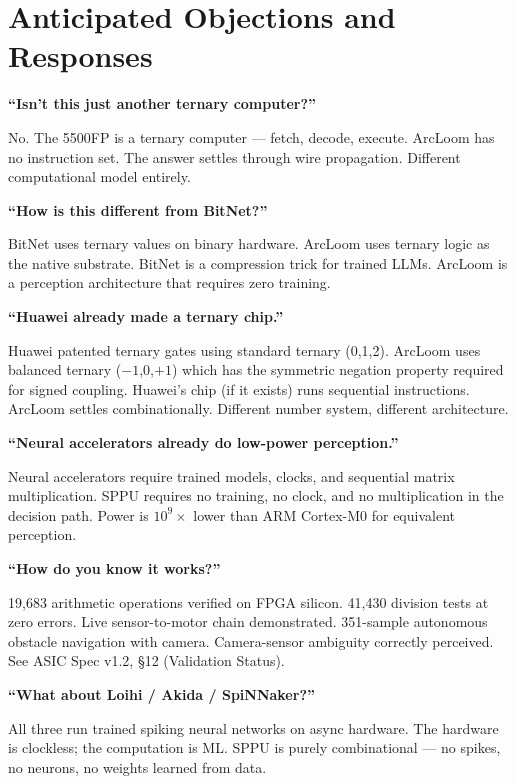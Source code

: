 \documentclass[11pt, a4paper]{article}
\begin{document}
\section{Anticipated Objections and Responses}

\textbf{``Isn't this just another ternary computer?''}

No. The 5500FP is a ternary computer --- fetch, decode, execute.
ArcLoom has no instruction set. The answer settles through wire
propagation. Different computational model entirely.

\textbf{``How is this different from BitNet?''}

BitNet uses ternary values on binary hardware. ArcLoom uses ternary
logic as the native substrate. BitNet is a compression trick for
trained LLMs. ArcLoom is a perception architecture that requires
zero training.

\textbf{``Huawei already made a ternary chip.''}

Huawei patented ternary gates using standard ternary (0,1,2). ArcLoom
uses balanced ternary ($-1$,0,$+1$) which has the symmetric negation
property required for signed coupling. Huawei's chip (if it exists)
runs sequential instructions. ArcLoom settles combinationally.
Different number system, different architecture.

\textbf{``Neural accelerators already do low-power perception.''}

Neural accelerators require trained models, clocks, and sequential
matrix multiplication. SPPU requires no training, no clock, and no
multiplication in the decision path. Power is $10^{9}\times$ lower
than ARM Cortex-M0 for equivalent perception.

\textbf{``How do you know it works?''}

19,683 arithmetic operations verified on FPGA silicon. 41,430 division
tests at zero errors. Live sensor-to-motor chain demonstrated.
351-sample autonomous obstacle navigation with camera. Camera-sensor
ambiguity correctly perceived. See ASIC Spec v1.2, \S12
(Validation Status).

\textbf{``What about Loihi / Akida / SpiNNaker?''}

All three run trained spiking neural networks on async hardware. The
hardware is clockless; the computation is ML. SPPU is purely
combinational --- no spikes, no neurons, no weights learned from data.

\end{document}
